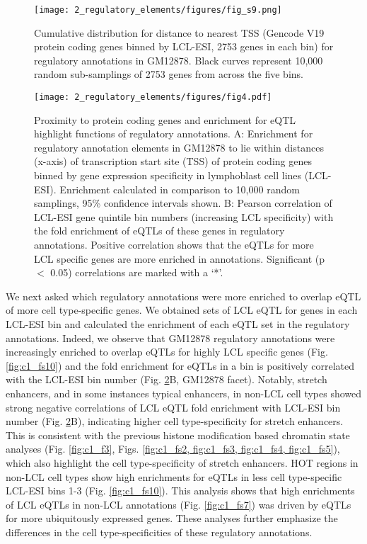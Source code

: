 \begin{figure}
    \centering
    \texttt{[image: 2\_regulatory\_elements/figures/fig\_s9.png]}
    \caption{Cumulative distribution for distance to nearest TSS (Gencode V19 protein coding genes binned by LCL-ESI, 2753 genes in each bin) for regulatory annotations in GM12878. Black curves represent 10,000 random sub-samplings of 2753 genes from across the five bins.}
    \label{fig:c1_fs9}
\end{figure}


\begin{figure}
    \centering
    \texttt{[image: 2\_regulatory\_elements/figures/fig4.pdf]}
    \caption{Proximity to protein coding genes and enrichment for eQTL highlight functions of regulatory annotations. A: Enrichment for regulatory annotation elements in GM12878 to lie within distances (x-axis) of transcription start site (TSS) of protein coding genes binned by gene expression specificity in lymphoblast cell lines (LCL-ESI). Enrichment calculated in comparison to 10,000 random samplings, 95\% confidence intervals shown. B: Pearson correlation of LCL-ESI gene quintile bin numbers (increasing LCL specificity) with the fold enrichment of eQTLs of these genes in regulatory annotations. Positive correlation shows that the eQTLs for more LCL specific genes are more enriched in annotations. Significant (p $<$ 0.05) correlations are marked with a ‘*’.}
    \label{fig:c1_f4}
\end{figure}

We next asked which regulatory annotations were more enriched to overlap eQTL of more cell type-specific genes. We obtained sets of LCL eQTL \cite{gtexconsortiumGeneticEffectsGene2017} for genes in each LCL-ESI bin and calculated the enrichment of each eQTL set in the regulatory annotations. Indeed, we observe that GM12878 regulatory annotations were increasingly enriched to overlap eQTLs for highly LCL specific genes (Fig. \ref{fig:c1_fs10}) and the fold enrichment for eQTLs in a bin is positively correlated with the LCL-ESI bin number (Fig. \ref{fig:c1_f4}B, GM12878 facet). Notably, stretch enhancers, and in some instances typical enhancers, in non-LCL cell types showed strong negative correlations of LCL eQTL fold enrichment with LCL-ESI bin number (Fig. \ref{fig:c1_f4}B), indicating higher cell type-specificity for stretch enhancers. This is consistent with the previous histone modification based chromatin state analyses (Fig. \ref{fig:c1_f3}, Figs. \ref{fig:c1_fs2, fig:c1_fs3, fig:c1_fs4, fig:c1_fs5}), which also highlight the cell type-specificity of stretch enhancers. HOT regions in non-LCL cell types show high enrichments for eQTLs in less cell type-specific LCL-ESI bins 1-3 (Fig. \ref{fig:c1_fs10}). This analysis shows that high enrichments of LCL eQTLs in non-LCL annotations (Fig. \ref{fig:c1_fs7}) was driven by eQTLs for more ubiquitously expressed genes. These analyses further emphasize the differences in the cell type-specificities of these regulatory annotations.\\

